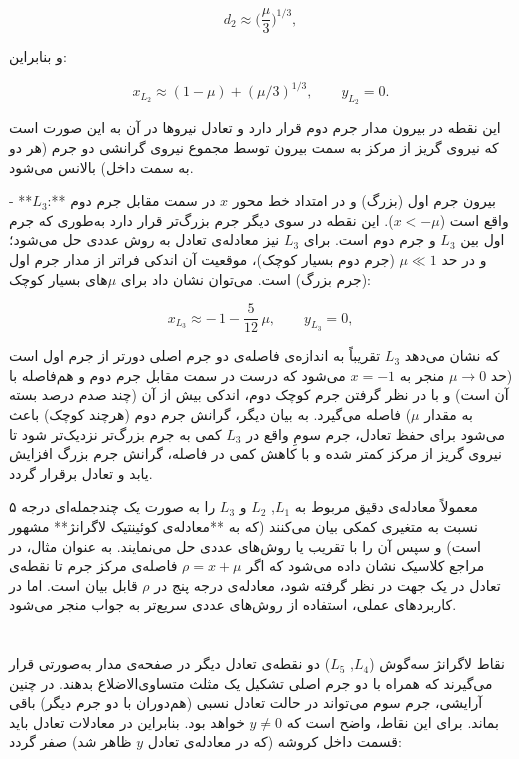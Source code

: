 $$d_2 \approx \Big(\dfrac{\mu}{3}\Big)^{1/3},$$ 

و بنابراین: 

$$x_{L_2} \approx (1-\mu) + (\mu/3)^{1/3}, \qquad y_{L_2}=0.$$ 

این نقطه در بیرون مدار جرم دوم قرار دارد و تعادل نیروها در آن به این صورت است که نیروی گریز از مرکز به سمت بیرون توسط مجموع نیروی گرانشی دو جرم (هر دو به سمت داخل) بالانس می‌شود. 

- **$L_3$:** بیرون جرم اول (بزرگ) و در امتداد خط محور $x$ در سمت مقابل جرم دوم واقع است ($x < -\mu$). این نقطه در سوی دیگر جرم بزرگ‌تر قرار دارد به‌طوری که جرم اول بین $L_3$ و جرم دوم است. برای $L_3$ نیز معادله‌ی تعادل به روش عددی حل می‌شود؛ و در حد $\mu \ll 1$ (جرم دوم بسیار کوچک)، موقعیت آن اندکی فراتر از مدار جرم اول (جرم بزرگ) است. می‌توان نشان داد برای $\mu$های بسیار کوچک: 

$$x_{L_3} \approx -\,1 - \dfrac{5}{12}\,\mu, \qquad y_{L_3}=0,$$ 

که نشان می‌دهد $L_3$ تقریباً به اندازه‌ی فاصله‌ی دو جرم اصلی دورتر از جرم اول است (حد $\mu \to 0$ منجر به $x=-1$ می‌شود که درست در سمت مقابل جرم دوم و هم‌فاصله با آن است) و با در نظر گرفتن جرم کوچک دوم، اندکی بیش از آن (چند صدم درصد بسته به مقدار $\mu$) فاصله می‌گیرد. به بیان دیگر، گرانش جرم دوم (هرچند کوچک) باعث می‌شود برای حفظ تعادل، جرم سومِ واقع در $L_3$ کمی به جرم بزرگ‌تر نزدیک‌تر شود تا نیروی گریز از مرکز کمتر شده و با کاهش کمی در فاصله، گرانش جرم بزرگ افزایش یابد و تعادل برقرار گردد.  

معمولاً معادله‌ی دقیق مربوط به $L_1$, $L_2$ و $L_3$ را به صورت یک چندجمله‌ای درجه ۵ نسبت به متغیری کمکی بیان می‌کنند (که به **معادله‌ی کوئینتیک لاگرانژ** مشهور است) و سپس آن را با تقریب یا روش‌های عددی حل می‌نمایند. به عنوان مثال، در مراجع کلاسیک نشان داده می‌شود که اگر $\rho = x + \mu$ فاصله‌ی مرکز جرم تا نقطه‌ی تعادل در یک جهت در نظر گرفته شود، معادله‌ی درجه پنج در $\rho$ قابل بیان است. اما در کاربردهای عملی، استفاده از روش‌های عددی سریع‌تر به جواب منجر می‌شود. 

\section{} نقاط لاگرانژ سه‌گوش ($L_4$, $L_5$)  
دو نقطه‌ی تعادل دیگر در صفحه‌ی مدار به‌صورتی قرار می‌گیرند که همراه با دو جرم اصلی تشکیل یک مثلث متساوی‌الاضلاع بدهند. در چنین آرایشی، جرم سوم می‌تواند در حالت تعادل نسبی (هم‌دوران با دو جرم دیگر) باقی بماند. برای این نقاط، واضح است که $y \neq 0$ خواهد بود. بنابراین در معادلات تعادل باید قسمت داخل کروشه (که در معادله‌ی تعادل $y$ ظاهر شد) صفر گردد:

